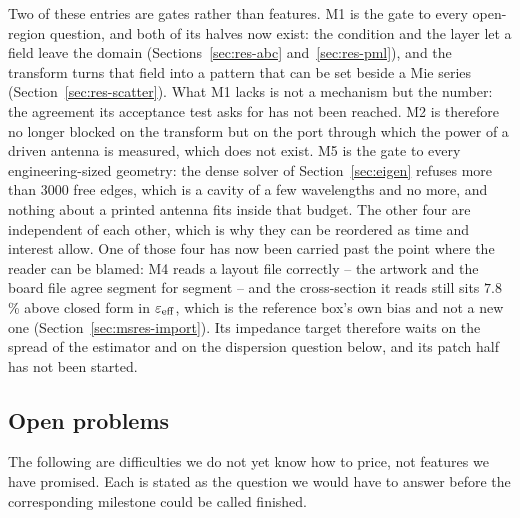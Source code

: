 Two of these entries are gates rather than features. M1 is the gate to every open-region question, and both of
its halves now exist: the condition and the layer let a field leave the domain (Sections~\ref{sec:res-abc}
and~\ref{sec:res-pml}), and the transform turns that field into a pattern that can be set beside a Mie series
(Section~\ref{sec:res-scatter}). What M1 lacks is not a mechanism but the number: the agreement its acceptance
test asks for has not been reached. M2 is therefore no longer blocked on the transform but on the port through
which the power of a driven antenna is measured, which does not exist. M5 is the
gate to every engineering-sized geometry: the dense solver of Section~\ref{sec:eigen} refuses more than $3000$
free edges, which is a cavity of a few wavelengths and no more, and nothing about a printed antenna fits inside
that budget. The other four are independent of each other, which is why they can be reordered as time and
interest allow. One of those four has now been carried past the point where the reader can be blamed: M4
reads a layout file correctly -- the artwork and the board file agree segment for segment -- and the
cross-section it reads still sits $7.8$\,\% above closed form in $\varepsilon_{\mathrm{eff}}$, which is the reference
box's own bias and not a new one (Section~\ref{sec:msres-import}). Its impedance target therefore waits on the
spread of the estimator and on the dispersion question below, and its patch half has not been started.

\subsection{Open problems}

The following are difficulties we do not yet know how to price, not features we have promised. Each is stated as
the question we would have to answer before the corresponding milestone could be called finished.

